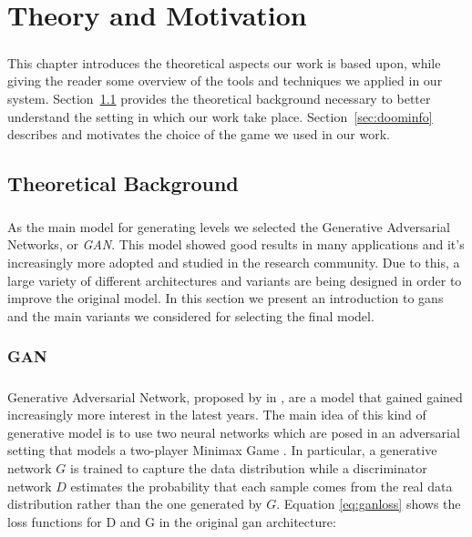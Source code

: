 \chapter{Theory and Motivation}
\label{ch:theory}
\paragraph{} This chapter introduces the theoretical aspects our work is based upon, while giving the reader some overview of the tools and techniques we applied in our system. Section~\ref{sec:gantheory} provides the theoretical background necessary to better understand the setting in which our work take place. Section~\ref{sec:doominfo} describes and motivates the choice of the game we used in our work. 

\section{Theoretical Background}
\label{sec:gantheory}
\paragraph{} As the main model for generating levels we selected the Generative Adversarial Networks, or \textit{GAN}. This model showed good results in many applications and it's increasingly more adopted and studied in the research community. Due to this, a large variety of different architectures and variants are being designed in order to improve the original model. In this section we present an introduction to \glspl{gan} and the main variants we considered for selecting the final model. 

\subsection{GAN}
\label{sec:introgan}
\paragraph{} Generative Adversarial Network, proposed by \citeauthor{gan}  \cite{gan} in \citeyear{gan}, are a model that gained gained increasingly more interest in the latest years. The main idea of this kind of generative model is to use two neural networks which are posed in an adversarial setting that models a two-player Minimax Game \cite[p.~276]{minimax}. In particular, a generative network $G$ is trained to capture the data distribution while a discriminator network $D$ estimates the probability that each sample comes from the real data distribution rather than the one generated by $G$. 
Equation \ref{eq:ganloss} shows the loss functions for D and G in the original \gls{gan} architecture\cite{gan}:


